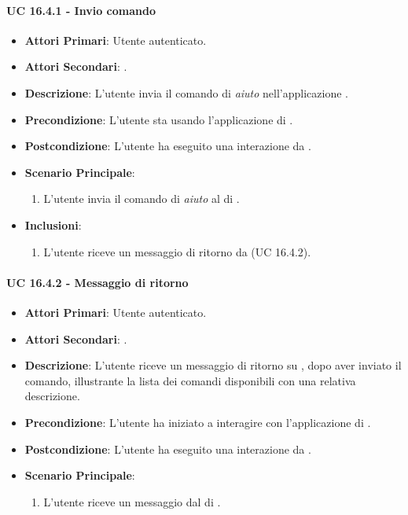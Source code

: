 		\paragraph{UC 16.4.1 - Invio comando}
		\begin{itemize}
			\item \textbf{Attori Primari}: Utente autenticato.
			\item \textbf{Attori Secondari}: .
			\item \textbf{Descrizione}: L'utente invia il comando di \textit{aiuto} nell'applicazione .
			\item \textbf{Precondizione}: L'utente sta usando l'applicazione di .
			\item \textbf{Postcondizione}: L'utente ha eseguito una interazione da .
			\item \textbf{Scenario Principale}:
			\begin{enumerate}
				\item L'utente invia il comando di \textit{aiuto} al  di .
			\end{enumerate}
			\item \textbf{Inclusioni}:
			\begin{enumerate}
				\item L'utente riceve un messaggio di ritorno da  (UC 16.4.2).
			\end{enumerate}
		\end{itemize}

		\paragraph{UC 16.4.2 - Messaggio di ritorno}
		\begin{itemize}
			\item \textbf{Attori Primari}: Utente autenticato.
			\item \textbf{Attori Secondari}: .
			\item \textbf{Descrizione}: L'utente riceve un messaggio di ritorno su , dopo aver inviato il comando, illustrante la lista dei comandi disponibili con una relativa descrizione.
			\item \textbf{Precondizione}: L'utente ha iniziato a interagire con l'applicazione di .
			\item \textbf{Postcondizione}: L'utente ha eseguito una interazione da .
			\item \textbf{Scenario Principale}:
			\begin{enumerate}
				\item L'utente riceve un messaggio dal  di .
			\end{enumerate}
		\end{itemize}	

